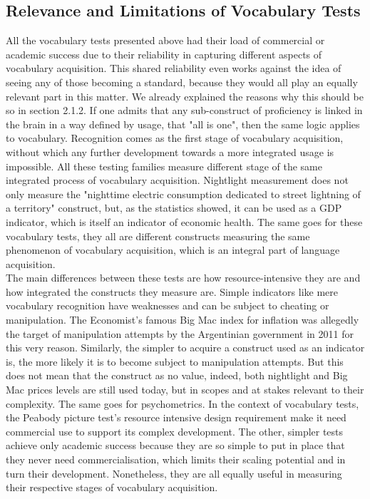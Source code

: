     \subsection{Relevance and Limitations of Vocabulary Tests}
All the vocabulary tests presented above had their load of commercial or academic success due to their reliability in capturing different aspects of vocabulary acquisition. This shared reliability even works against the idea of seeing any of those becoming a standard, because they would all play an equally relevant part in this matter. We already explained the reasons why this should be so in section 2.1.2. If one admits that any sub-construct of proficiency is linked in the brain in a way defined by usage, that "all is one", then the same logic applies to vocabulary. Recognition comes as the first stage of vocabulary acquisition, without which any further development towards a more integrated usage is impossible. All these testing families measure different stage of the same integrated process of vocabulary acquisition. Nightlight measurement does not only measure the "nighttime electric consumption dedicated to street lightning of a territory" construct, but, as the statistics showed, it can be used as a GDP indicator, which is itself an indicator of economic health. The same goes for these vocabulary tests, they all are different constructs measuring the same phenomenon of vocabulary acquisition, which is an integral part of language acquisition. \\
The main differences between these tests are how resource-intensive they are and how integrated the constructs they measure are. Simple indicators like mere vocabulary recognition have weaknesses and can be subject to cheating or manipulation. The Economist's famous Big Mac index for inflation was allegedly the target of manipulation attempts by the Argentinian government in 2011 \parencite{politi_argentinas_2011} for this very reason. Similarly, the simpler to acquire a construct used as an indicator is, the more likely it is to become subject to manipulation attempts. But this does not mean that the construct as no value, indeed, both nightlight and Big Mac prices levels are still used today, but in scopes and at stakes relevant to their complexity. The same goes for psychometrics. In the context of vocabulary tests, the Peabody picture test's resource intensive design requirement make it need commercial use to support its complex development. The other, simpler tests achieve only academic success because they are so simple to put in place that they never need commercialisation, which limits their scaling potential and in turn their development. Nonetheless, they are all equally useful in measuring their respective stages of vocabulary acquisition.\\

